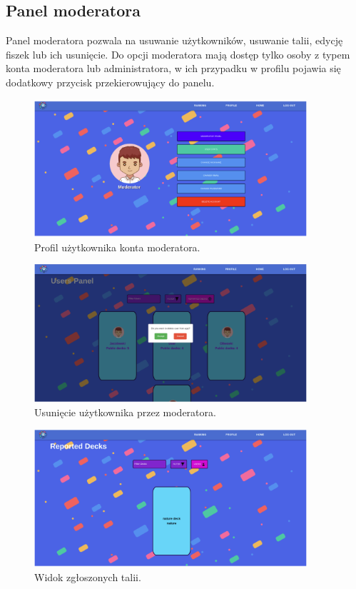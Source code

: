 \subsection{Panel moderatora}
Panel moderatora pozwala na usuwanie użytkowników, usuwanie talii, edycję fiszek lub ich usunięcie. Do opcji moderatora mają dostęp tylko osoby z typem konta moderatora lub administratora, w ich przypadku w profilu pojawia się dodatkowy przycisk przekierowujący do panelu.


\begin{figure}[H]
    \centering
    \includegraphics[width=0.9\textwidth]{chapters/chapter_10/images_web/web_moderator_profile}
    \caption{Profil użytkownika konta moderatora.}
    \label{img:web_moderator_profile}
\end{figure}


\begin{figure}[H]
    \centering
    \includegraphics[width=0.9\textwidth]{chapters/chapter_10/images_web/web_moderator_delete_user}
    \caption{Usunięcie użytkownika przez moderatora.}
    \label{img:web_moderator_delete_user}
\end{figure}


\begin{figure}[H]
    \centering
    \includegraphics[width=0.9\textwidth]{chapters/chapter_10/images_web/web_reported_decks}
    \caption{Widok zgłoszonych talii.}
    \label{img:web_reported_decks}
\end{figure}


